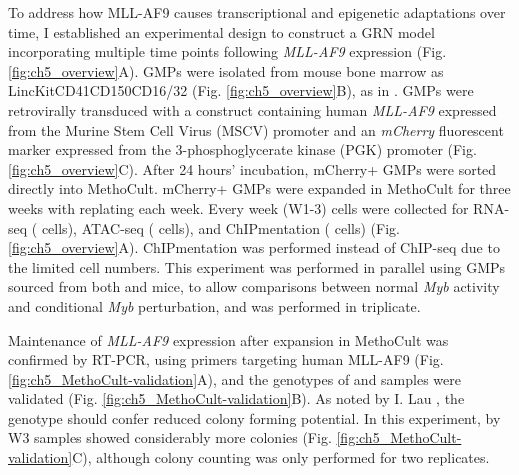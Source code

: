 To address how MLL-AF9 causes transcriptional and epigenetic adaptations over time, I established an experimental design to construct a GRN model incorporating multiple time points following \textit{MLL-AF9} expression (Fig. \ref{fig:ch5_overview}A). GMPs were isolated from mouse bone marrow as Lin\uneg{}cKit\upos{}CD41\uneg{}CD150\uneg{}CD16/32\upos{} (Fig. \ref{fig:ch5_overview}B), as in \cite{pronk_elucidation_2007}. GMPs were retrovirally transduced with a construct containing human \textit{MLL-AF9} expressed from the Murine Stem Cell Virus (MSCV) promoter and an \textit{mCherry} fluorescent marker expressed from the 3-phosphoglycerate kinase (PGK) promoter (Fig. \ref{fig:ch5_overview}C). After 24 hours' incubation, mCherry+ GMPs were sorted directly into MethoCult. mCherry+ GMPs were expanded in MethoCult for three weeks with replating each week. Every week (W1-3) cells were collected for RNA-seq ( cells), ATAC-seq ( cells), and ChIPmentation ( cells) (Fig. \ref{fig:ch5_overview}A). ChIPmentation was performed instead of ChIP-seq due to the limited cell numbers. This experiment was performed in parallel using GMPs sourced from both \mybwt{} and \mybmre{} mice, to allow comparisons between normal \textit{Myb} activity and conditional \textit{Myb} perturbation, and was performed in triplicate.

Maintenance of \textit{MLL-AF9} expression after expansion in MethoCult was confirmed by RT-PCR, using primers targeting human MLL-AF9 (Fig. \ref{fig:ch5_MethoCult-validation}A), and the genotypes of \mybwt{} and \mybmre{} samples were validated (Fig. \ref{fig:ch5_MethoCult-validation}B). As noted by I. Lau \citep{lau_role_2022}, the \mybmre{} genotype should confer reduced colony forming potential. In this experiment, by W3 \mybwt{} samples showed considerably more colonies (Fig. \ref{fig:ch5_MethoCult-validation}C), although colony counting was only performed for two replicates. 

